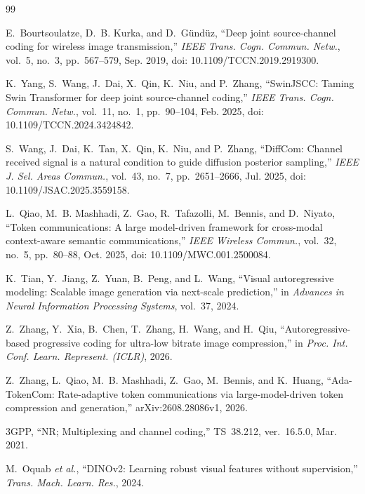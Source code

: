 \documentclass[journal]{IEEEtran}
\begin{document}

\begin{thebibliography}{99}

E.~Bourtsoulatze, D.~B. Kurka, and D.~G\"und\"uz, ``Deep joint source-channel coding for wireless image transmission,'' \emph{IEEE Trans. Cogn. Commun. Netw.}, vol.~5, no.~3, pp.~567--579, Sep. 2019, doi: 10.1109/TCCN.2019.2919300.

K.~Yang, S.~Wang, J.~Dai, X.~Qin, K.~Niu, and P.~Zhang, ``SwinJSCC: Taming Swin Transformer for deep joint source-channel coding,'' \emph{IEEE Trans. Cogn. Commun. Netw.}, vol.~11, no.~1, pp.~90--104, Feb. 2025, doi: 10.1109/TCCN.2024.3424842.

S.~Wang, J.~Dai, K.~Tan, X.~Qin, K.~Niu, and P.~Zhang, ``DiffCom: Channel received signal is a natural condition to guide diffusion posterior sampling,'' \emph{IEEE J. Sel. Areas Commun.}, vol.~43, no.~7, pp.~2651--2666, Jul. 2025, doi: 10.1109/JSAC.2025.3559158.

L.~Qiao, M.~B. Mashhadi, Z.~Gao, R.~Tafazolli, M.~Bennis, and D.~Niyato, ``Token communications: A large model-driven framework for cross-modal context-aware semantic communications,'' \emph{IEEE Wireless Commun.}, vol.~32, no.~5, pp.~80--88, Oct. 2025, doi: 10.1109/MWC.001.2500084.

K.~Tian, Y.~Jiang, Z.~Yuan, B.~Peng, and L.~Wang, ``Visual autoregressive modeling: Scalable image generation via next-scale prediction,'' in \emph{Advances in Neural Information Processing Systems}, vol.~37, 2024.

Z.~Zhang, Y.~Xia, B.~Chen, T.~Zhang, H.~Wang, and H.~Qiu, ``Autoregressive-based progressive coding for ultra-low bitrate image compression,'' in \emph{Proc. Int. Conf. Learn. Represent. (ICLR)}, 2026.

Z.~Zhang, L.~Qiao, M.~B. Mashhadi, Z.~Gao, M.~Bennis, and K.~Huang, ``Ada-TokenCom: Rate-adaptive token communications via large-model-driven token compression and generation,'' arXiv:2608.28086v1, 2026.

3GPP, ``NR; Multiplexing and channel coding,'' TS~38.212, ver.~16.5.0, Mar. 2021.

M.~Oquab \emph{et al.}, ``DINOv2: Learning robust visual features without supervision,'' \emph{Trans. Mach. Learn. Res.}, 2024.


\end{thebibliography}
\end{document}

